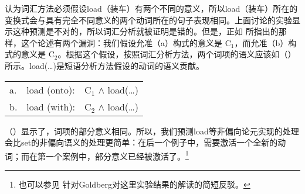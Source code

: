 \begin{exe}
\begin{xlist}[iv.]
\begin{exe}
\begin{xlist}[iv.]
 \citet[]{Goldberg95a}认为词汇方法必须假设load（装车）有两个不同的意义，所以load（装车）所在的变换式会与具有完全不同意义的两个动词所在的句子表现相同。上面讨论的实验显示这种预测是不对的，所以词汇分析就被证明是错的。但是，正如 所指出的那样，这个论述有两个漏洞：我们假设允准（a）构式的意义是 C$_1$，而允准（b）构式的意义是 C$_2$。根据这个假设，按照词汇分析方法，两个词项的语义应该如（）所示。load(\ldots)是短语分析方法假设的动词的语义贡献。
\ea
\begin{tabular}[t]{@{}l@{~}l@{~}l@{}}
a. & load (onto): & C$_1$ $\wedge$ load(\ldots)\\
b. & load (with): & C$_2$ $\wedge$ load(\ldots)\\
\end{tabular}
\z
（）显示了，词项的部分意义相同。所以，我们预测load等非偏向论元实现的处理会比set的非偏向语义的处理更简单：在后一个例子中，需要激活一个全新的动词；而在第一个案例中，部分意义已经被激活了。\footnote{%
   也可以参见 针对Goldberg对这里实验结果的解读的简短反驳。%
}


\end{xlist}
\end{exe}
\end{xlist}
\end{exe}
